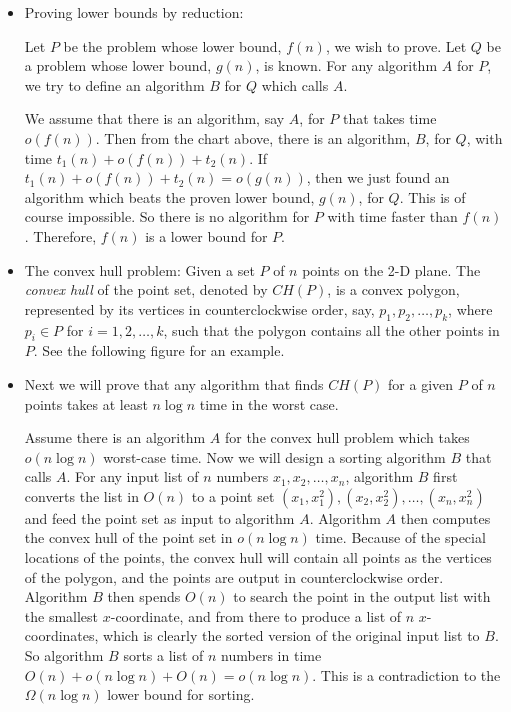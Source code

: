 \begin{itemize}

\item Proving lower bounds by reduction:

Let $P$ be the problem whose lower bound, $f(n)$, we wish to prove.
Let $Q$ be a problem whose lower bound, $g(n)$, is known. For any 
algorithm $A$ for $P$, we try to define an algorithm $B$ for $Q$ which
calls $A$.


We assume that there is an algorithm, say $A$, for $P$ that takes
time $o(f(n))$. Then from the chart above, there is an algorithm,
$B$, for $Q$, with time $t_1(n)+o(f(n))+t_2(n)$. If $t_1(n)+o(f(n))+t_2(n)
=o(g(n))$, then we just found an algorithm which beats the proven
lower bound, $g(n)$, for $Q$. This is of course impossible. 
So there is no algorithm for $P$ with time faster than $f(n)$.
Therefore, $f(n)$ is a lower bound for $P$.

\item The convex hull problem: Given a set $P$ of $n$ points on the 2-D plane.
The {\em convex hull} of the point set, denoted by $CH(P)$, is a convex
polygon, represented by its vertices in counterclockwise order, say,
$p_1, p_2, \ldots, p_k$, where $p_i\in P$ for $i=1, 2, \ldots, k$,
such that the polygon contains all the other points in $P$. See the
following figure for an example.

\item Next we will prove that any algorithm that finds $CH(P)$ for a given
$P$ of $n$ points takes at least $n\log n$ time in the worst case.

Assume there is an algorithm $A$ for the convex hull problem which
takes $o(n\log n)$ worst-case time. Now we will design a sorting
algorithm $B$ that calls $A$. For any input list of $n$ numbers
$x_1, x_2, \ldots, x_n$, algorithm $B$ first converts the list in $O(n)$
to a point set $(x_1, x_1^2), (x_2, x_2^2), \ldots, (x_n, x_n^2)$
and feed the point set as input to algorithm $A$. Algorithm $A$ then
computes the convex hull of the point set in $o(n \log n)$ time.
Because of the special locations of the points, the convex hull will
contain all points as the vertices of the polygon, and the points
are output in counterclockwise order. Algorithm $B$ then spends $O(n)$
to search the point in the output list with the smallest $x$-coordinate,
and from there to produce a list of $n$ $x$-coordinates, which is clearly
the sorted version of the original input list to $B$. So algorithm $B$
sorts a list of $n$ numbers in time $O(n)+o(n\log n)+O(n)=o(n\log n)$.
This is a contradiction to the $\Omega(n\log n)$ lower bound for sorting.

\end{itemize}
